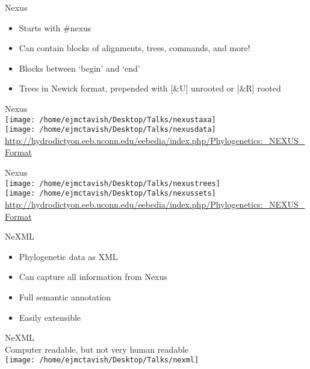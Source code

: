 \documentclass{beamer}
\begin{document}
\begin{frame}
Nexus\\
\begin{itemize}
 \item Starts with \#nexus
 \item Can contain blocks of alignments, trees, commands, and more!
 \item Blocks between `begin' and `end'
 \item Trees in Newick format, prepended with [\&U] unrooted or [\&R] rooted
\end{itemize}
\end{frame}

\begin{frame}
Nexus\\
\texttt{[image: /home/ejmctavish/Desktop/Talks/nexustaxa]}\\
\texttt{[image: /home/ejmctavish/Desktop/Talks/nexusdata]}\\
\url{http://hydrodictyon.eeb.uconn.edu/eebedia/index.php/Phylogenetics:_NEXUS_Format}
\end{frame}
\begin{frame}
Nexus\\
\texttt{[image: /home/ejmctavish/Desktop/Talks/nexustrees]}\\
\texttt{[image: /home/ejmctavish/Desktop/Talks/nexussets]}\\
\url{http://hydrodictyon.eeb.uconn.edu/eebedia/index.php/Phylogenetics:_NEXUS_Format}
\end{frame}


\begin{frame}
NeXML\\
\begin{itemize}
 \item Phylogenetic data as XML
 \item Can capture all information from Nexus
 \item Full semantic annotation
 \item Easily extensible
\end{itemize}
\end{frame}

\begin{frame}
NeXML\\
Computer readable, but not very human readable\\
\texttt{[image: /home/ejmctavish/Desktop/Talks/nexml]}\\
\end{frame}
\end{document}
